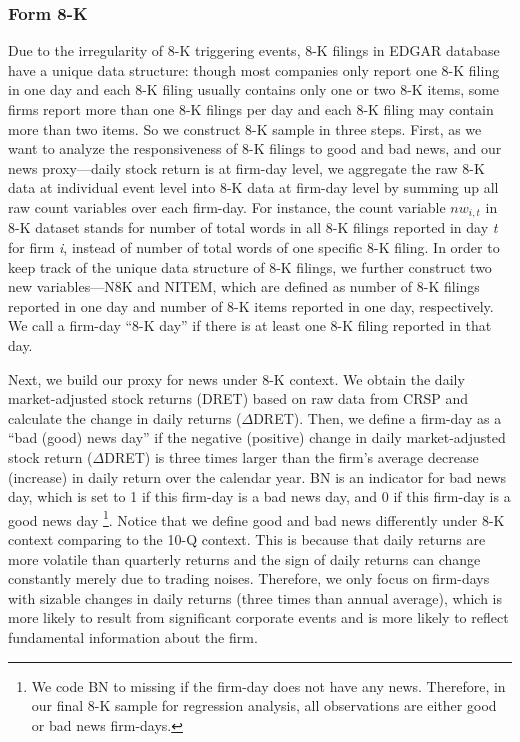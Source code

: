 \documentclass[a4paper]{article}
\begin{document}
\begin{spacing}{2}
\subsubsection{Form 8-K}
Due to the irregularity of 8-K triggering events, 8-K filings in EDGAR database have a unique data structure: though most companies only report one 8-K filing in one day and each 8-K filing usually contains only one or two 8-K items, some firms report more than one 8-K filings per day and each 8-K filing may contain more than two items. So we construct 8-K sample in three steps. First, as we want to analyze the responsiveness of 8-K filings to good and bad news, and our news proxy---daily stock return is at firm-day level, we aggregate the raw 8-K data at individual event level into 8-K data at firm-day level by summing up all raw count variables over each firm-day. For instance, the count variable $nw_{i,t}$ in 8-K dataset stands for number of total words in all 8-K filings reported in day \textit{t} for firm \textit{i}, instead of number of total words of one specific 8-K filing. In order to keep track of the unique data structure of 8-K filings, we further construct two new variables---N8K and NITEM, which are defined as number of 8-K filings reported in one day and number of 8-K items reported in one day, respectively. We call a firm-day “8-K day” if there is at least one 8-K filing reported in that day.

Next, we build our proxy for news under 8-K context. We obtain the daily market-adjusted stock returns (DRET) based on raw data from CRSP and calculate the change in daily returns ($\Delta$DRET). Then, we define a firm-day as a “bad (good) news day” if the negative (positive) change in daily market-adjusted stock return ($\Delta$DRET) is three times larger than the firm's average decrease (increase) in daily return over the calendar year. BN is an indicator for bad news day, which is set to 1 if this firm-day is a bad news day, and 0 if this firm-day is a good news day \footnote{We code BN to missing if the firm-day does not have any news. Therefore, in our final 8-K sample for regression analysis, all observations are either good or bad news firm-days.}. Notice that we define good and bad news differently under 8-K context comparing to the 10-Q context. This is because that daily returns are more volatile than quarterly returns and the sign of daily returns can change constantly merely due to trading noises. Therefore, we only focus on firm-days with sizable changes in daily returns (three times than annual average), which is more likely to result from significant corporate events and is more likely to reflect fundamental information about the firm.


\end{spacing}
\end{document}
